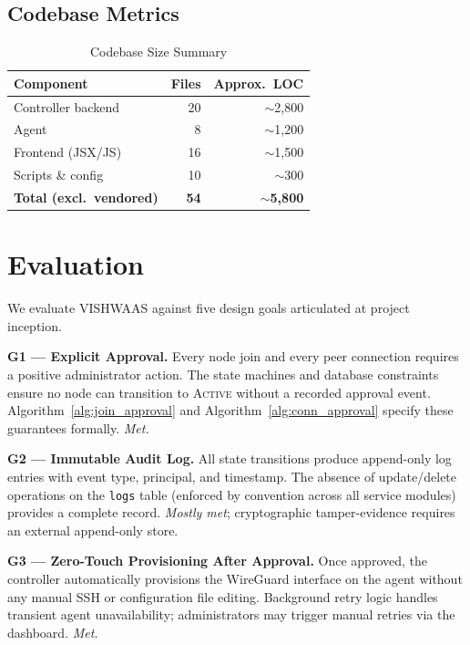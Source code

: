 \documentclass[conference]{IEEEtran}
\begin{document}
\subsection{Codebase Metrics}

\begin{table}[!t]
\caption{Codebase Size Summary}
\label{tab:codebase}
\centering
\begin{tabular}{lrr}
\toprule
\textbf{Component} & \textbf{Files} & \textbf{Approx.\ LOC} \\
\midrule
Controller backend & 20 & $\sim$2{,}800 \\
Agent              &  8 & $\sim$1{,}200 \\
Frontend (JSX/JS)  & 16 & $\sim$1{,}500 \\
Scripts \& config  & 10 & $\sim$300 \\
\midrule
\textbf{Total (excl.\ vendored)} & \textbf{54} & \textbf{$\sim$5{,}800} \\
\bottomrule
\end{tabular}
\end{table}


\FloatBarrier
\section{Evaluation}
\label{sec:evaluation}

We evaluate VISHWAAS against five design goals articulated at project inception.

\textbf{G1 — Explicit Approval.} Every node join and every peer connection requires
a positive administrator action. The state machines and database constraints ensure
no node can transition to \textsc{Active} without a recorded approval event.
Algorithm~\ref{alg:join_approval} and Algorithm~\ref{alg:conn_approval} specify
these guarantees formally. \textit{Met.}

\textbf{G2 — Immutable Audit Log.} All state transitions produce append-only log
entries with event type, principal, and timestamp. The absence of
update/delete operations on the \texttt{logs} table (enforced by convention across
all service modules) provides a complete record. \textit{Mostly met}; cryptographic
tamper-evidence requires an external append-only store.

\textbf{G3 — Zero-Touch Provisioning After Approval.} Once approved, the
controller automatically provisions the WireGuard interface on the agent without
any manual SSH or configuration file editing. Background retry logic handles
transient agent unavailability; administrators may trigger manual retries via the
dashboard. \textit{Met.}
\end{document}
